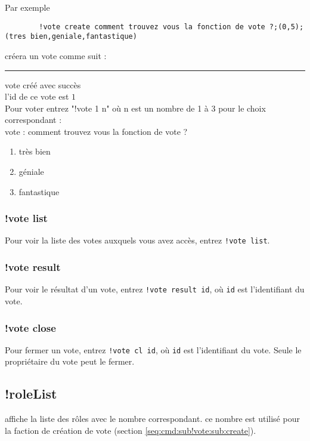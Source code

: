 \documentclass[a4paper,12pt,twoside]{article}
\begin{document}
		Par exemple
		\begin{lstlisting}
		!vote create comment trouvez vous la fonction de vote ?;(0,5);(tres bien,geniale,fantastique) 
		\end{lstlisting}
		créera un vote comme suit :
		
		\begin{minipage}{0.01\textwidth}
			\rule{0.4pt}{4.5cm}
		\end{minipage}
		\begin{minipage}{.95\textwidth}
			
			vote créé avec succès\\
			l'id de ce vote est $1$\\
			Pour voter entrez "!vote 1 n" où n est un nombre de 1 à 3 pour le choix correspondant : \\
			vote : comment trouvez vous la fonction de vote ?
			\begin{enumerate}[label =\arabic*)]
				 \item très bien
				 \item géniale
				 \item fantastique
			\end{enumerate}
		\end{minipage}
		\subsubsection{!vote list}\label{seq:cmd:sub!vote:sub:list}
		Pour voir la liste des votes auxquels vous avez accès, entrez \verb|!vote list|.
		\subsubsection{!vote result}
		
		Pour voir le résultat d'un vote, entrez \verb|!vote result id|, où \verb|id| est l'identifiant du vote. 
		
		\subsubsection{!vote close}
		Pour fermer un vote, entrez \verb|!vote cl id|, où \verb|id| est l'identifiant du vote. Seule le propriétaire du vote peut le fermer.
		
\subsection{!roleList}\label{seq:cmd:sub:!roleList}
affiche la liste des rôles avec le nombre correspondant. ce nombre est utilisé pour la faction de création de vote (section \ref{seq:cmd:sub!vote:sub:create}).
		
\end{document}

